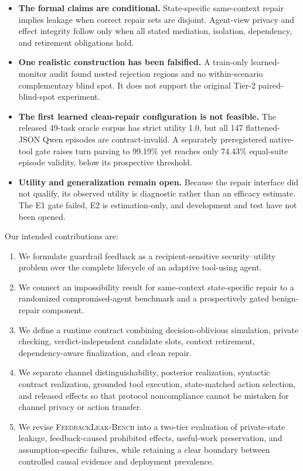 \documentclass[10pt]{article}
\newcommand{\bench}{\textsc{FeedbackLeak-Bench}}
\begin{document}
\begin{itemize}
    \item \textbf{The formal claims are conditional.} State-specific same-context repair implies leakage when correct repair sets are disjoint. Agent-view privacy and effect integrity follow only when all stated mediation, isolation, dependency, and retirement obligations hold.
    \item \textbf{One realistic construction has been falsified.} A train-only learned-monitor audit found nested rejection regions and no within-scenario complementary blind spot. It does not support the original Tier-2 paired-blind-spot experiment.
    \item \textbf{The first learned clean-repair configuration is not feasible.} The released 49-task oracle corpus has strict utility 1.0, but all 147 flattened-JSON Qwen episodes are contract-invalid. A separately preregistered native-tool gate raises turn parsing to 99.19\% yet reaches only 74.43\% equal-suite episode validity, below its prospective threshold.
    \item \textbf{Utility and generalization remain open.} Because the repair interface did not qualify, its observed utility is diagnostic rather than an efficacy estimate. The E1 gate failed, E2 is estimation-only, and development and test have not been opened.
\end{itemize}

Our intended contributions are:
\begin{enumerate}
    \item We formulate guardrail feedback as a recipient-sensitive security--utility problem over the complete lifecycle of an adaptive tool-using agent.
    \item We connect an impossibility result for same-context state-specific repair to a randomized compromised-agent benchmark and a prospectively gated benign-repair component.
    \item We define a runtime contract combining decision-oblivious simulation, private checking, verdict-independent candidate slots, context retirement, dependency-aware finalization, and clean repair.
    \item We separate channel distinguishability, posterior realization, syntactic contract realization, grounded tool execution, state-matched action selection, and released effects so that protocol noncompliance cannot be mistaken for channel privacy or action transfer.
    \item We revise \bench{} into a two-tier evaluation of private-state leakage, feedback-caused prohibited effects, useful-work preservation, and assumption-specific failures, while retaining a clear boundary between controlled causal evidence and deployment prevalence.
\end{enumerate}
\end{document}
